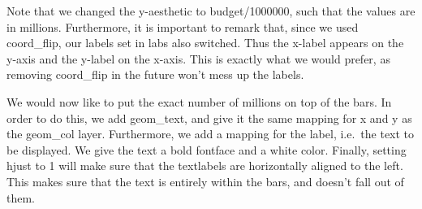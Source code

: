 \documentclass[]{tufte-book}
\newenvironment{Shaded}{}{}
\newcommand{\DataTypeTok}[1]{\textcolor[rgb]{0.56,0.13,0.00}{#1}}
\newcommand{\DecValTok}[1]{\textcolor[rgb]{0.25,0.63,0.44}{#1}}
\newcommand{\KeywordTok}[1]{\textcolor[rgb]{0.00,0.44,0.13}{\textbf{#1}}}
\newcommand{\NormalTok}[1]{#1}
\newcommand{\OperatorTok}[1]{\textcolor[rgb]{0.40,0.40,0.40}{#1}}
\newcommand{\StringTok}[1]{\textcolor[rgb]{0.25,0.44,0.63}{#1}}
\begin{document}
Note that we changed the y-aesthetic to budget/1000000, such that the values are in millions. Furthermore, it is important to remark that, since we used coord\_flip, our labels set in labs also switched. Thus the x-label appears on the y-axis and the y-label on the x-axis. This is exactly what we would prefer, as removing coord\_flip in the future won't mess up the labels.

We would now like to put the exact number of millions on top of the bars. In order to do this, we add geom\_text, and give it the same mapping for x and y as the geom\_col layer. Furthermore, we add a mapping for the label, i.e.~the text to be displayed. We give the text a bold fontface and a white color. Finally, setting hjust to 1 will make sure that the textlabels are horizontally aligned to the left. This makes sure that the text is entirely within the bars, and doesn't fall out of them.

\begin{Shaded}
\end{Shaded}
\end{document}
